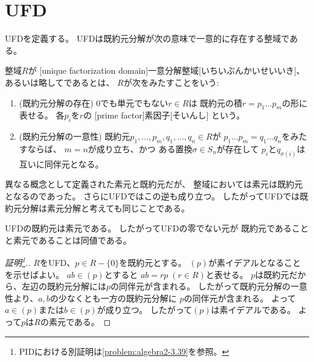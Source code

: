 \documentclass[report]{jlreq}
\begin{document}
%
\section{UFD}

UFDを定義する。
UFDは既約元分解が次の意味で一意的に存在する整域である。

\begin{definition}[UFD]
    整域$R$が
    [unique factorization domain]{一意分解整域}[いちいぶんかいせいいき]、
    あるいは略してであるとは、
    $R$が次をみたすことをいう:
    \begin{enumerate}
        \item (既約元分解の存在)
            $0$でも単元でもない$r \in R$は
            既約元の積$r = p_1 \dots p_m$の形に表せる。
            各$p_i$を$r$の
            [prime factor]{素因子}[そいんし]
            という。
        \item (既約元分解の一意性)
            既約元$p_1, \dots, p_m, q_1, \dots, q_n \in R$が
            $p_1 \dots p_m = q_1 \dots q_n$をみたすならば、
            $m = n$が成り立ち、かつ
            ある置換$\sigma \in S_n$が存在して
            $p_i$と$q_{\sigma(i)}$は互いに同伴元となる。
    \end{enumerate}
\end{definition}

異なる概念として定義された素元と既約元だが、
整域においては素元は既約元となるのであった。
さらにUFDではこの逆も成り立つ。
したがってUFDでは既約元分解は素元分解と考えても同じことである。

\begin{proposition}[UFDの既約元は素元]
    UFDの既約元は素元である。
    したがってUFDの零でない元が
    既約元であることと素元であることは同値である。
\end{proposition}

\begin{proof}[証明\footnote{
    PIDにおける別証明は\cref{problem:algebra2-3.39}を参照。
}.]
    $R$をUFD、$p \in R - \{ 0 \}$を既約元とする。
    $(p)$が素イデアルとなることを示せばよい。
    $ab \in (p)$とすると
    $ab = rp \; (r \in R)$と表せる。
    $p$は既約元だから、左辺の既約元分解には$p$の同伴元が含まれる。
    したがって既約元分解の一意性より、$a, b$の少なくとも一方の既約元分解に
    $p$の同伴元が含まれる。
    よって$a \in (p)$または$b \in (p)$が成り立つ。
    したがって$(p)$は素イデアルである。
    よって$p$は$R$の素元である。
\end{proof}
\end{document}
